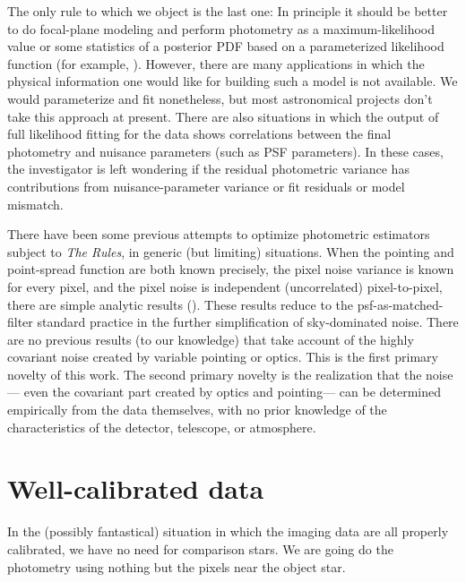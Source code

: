 \documentclass[12pt, letterpaper, preprint]{aastex}
\begin{document}
The only rule to which we object is the last one:
In principle it should be better to do focal-plane modeling
  and perform photometry as a maximum-likelihood value
  or some statistics of a posterior PDF
  based on a parameterized likelihood function (for example, \citealt{hoggwhitepaper}).
However, there are many applications in which
  the physical information one would like for building such a model is not available.
We would parameterize and fit nonetheless,
  but most astronomical projects don't take this approach at present.
There are also situations in which the output of full likelihood fitting for the data
  shows correlations between the final photometry and nuisance parameters (such as PSF parameters).
In these cases, the investigator is left wondering if the residual photometric variance
  has contributions from nuisance-parameter variance or fit residuals or model mismatch.

There have been some previous attempts to optimize photometric estimators subject to \emph{The Rules},
  in generic (but limiting) situations.
When the pointing and point-spread function are both known precisely,
  the pixel noise variance is known for every pixel,
  and the pixel noise is independent (uncorrelated) pixel-to-pixel,
  there are simple analytic results (\cite{naylor}).
These results reduce to the psf-as-matched-filter standard practice
  in the further simplification of sky-dominated noise.
There are no previous results (to our knowledge) that take account of
  the highly covariant noise created by variable pointing or optics.
This is the first primary novelty of this work.
The second primary novelty is the realization that the noise---%
  even the covariant part created by optics and pointing---%
  can be determined empirically from the data themselves,
  with no prior knowledge of the characteristics of the detector,
  telescope, or atmosphere.

\section{Well-calibrated data}

In the (possibly fantastical) situation in which the imaging data are all properly calibrated,
  we have no need for comparison stars.
We are going do the photometry using nothing but the pixels near the object star.
\end{document}
